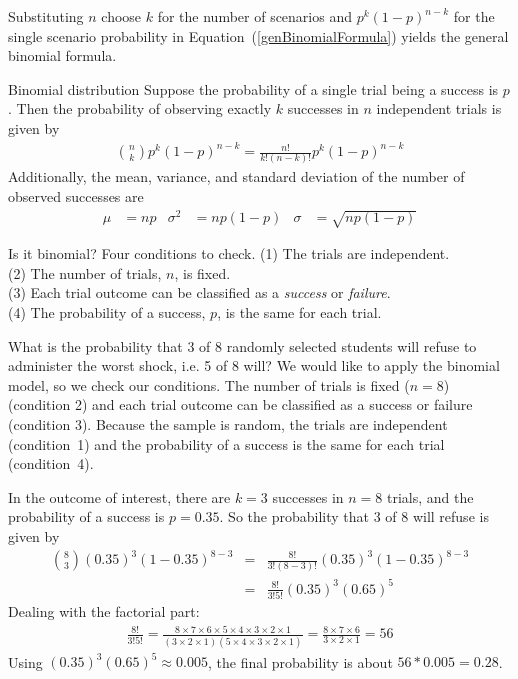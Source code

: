 Substituting $n$ choose $k$ for the number of scenarios and $p^k(1-p)^{n-k}$ for the single scenario probability in Equation~(\ref{genBinomialFormula}) yields the general binomial formula.

\begin{onebox}{Binomial distribution}
  Suppose the probability of a single trial being a success is $p$. Then the probability of observing exactly $k$ successes in $n$ independent trials is given by\vspace{-1mm}
\begin{eqnarray}
{n\choose k}p^k(1-p)^{n-k} = \frac{n!}{k!(n-k)!}p^k(1-p)^{n-k}
\label{binomialFormula}
\end{eqnarray}
Additionally, the mean, variance, and standard deviation of the number of observed successes are\vspace{-2mm}
\begin{align}
\mu &= np
	&\sigma^2 &= np(1-p)
	&\sigma &= \sqrt{np(1-p)}
\label{binomialStats}
\end{align}
\end{onebox}

\begin{onebox}{Is it binomial? Four conditions to check.}
\label{isItBinomialTipBox}%
(1) The trials are independent. \\
(2) The number of trials, $n$, is fixed. \\
(3) Each trial outcome can be classified as a \emph{success} or \emph{failure}. \\
(4) The probability of a success, $p$, is the same for each trial.
\end{onebox}

\begin{examplewrap}
\begin{nexample}{What is the probability that 3 of 8 randomly selected students will refuse to administer the worst shock, i.e. 5 of 8 will?}
We would like to apply the binomial model, so we check our conditions. The number of trials is fixed ($n=8$) (condition 2) and each trial outcome can be classified as a success or failure (condition 3). Because the sample is random, the trials are independent (condition~1) and the probability of a success is the same for each trial (condition~4).

In the outcome of interest, there are $k=3$ successes in $n=8$ trials, and the probability of a success is $p=0.35$. So the probability that 3 of 8 will refuse is given by
\begin{eqnarray*}
{ 8 \choose 3}(0.35)^3(1-0.35)^{8-3}
	&=& \frac{8!}{3!(8-3)!}(0.35)^3(1-0.35)^{8-3} \\
	&=& \frac{8!}{3!5!}(0.35)^3(0.65)^5
\end{eqnarray*}
Dealing with the factorial part:
\begin{eqnarray*}
\frac{8!}{3!5!} = \frac{8\times7\times6\times5\times4\times3\times2\times1}{(3\times2\times1)(5\times4\times3\times2\times1)} = \frac{8\times7\times6}{3\times2\times1} = 56
\end{eqnarray*}
Using $(0.35)^3(0.65)^5 \approx 0.005$, the final probability is about $56*0.005 = 0.28$.
\end{nexample}
\end{examplewrap}

